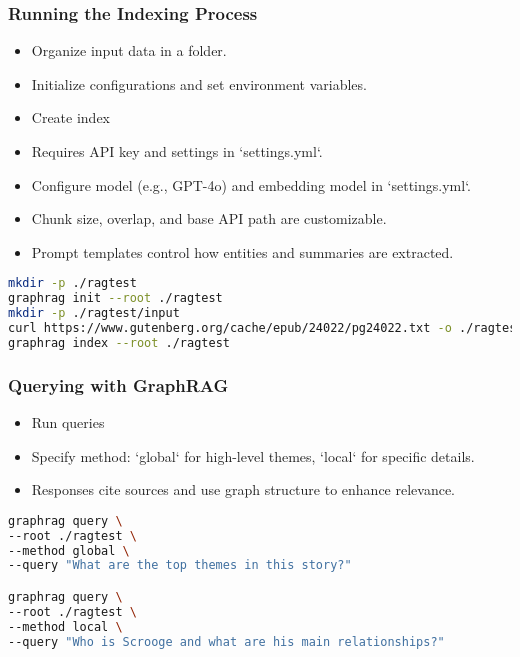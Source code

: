 \begin{frame}[fragile]\frametitle{Running the Indexing Process}
  \begin{itemize}
    \item Organize input data in a folder.
    \item Initialize configurations and set environment variables.
    \item Create index
    \item Requires API key and settings in `settings.yml`.
    \item Configure model (e.g., GPT-4o) and embedding model in `settings.yml`.
    \item Chunk size, overlap, and base API path are customizable.
    \item Prompt templates control how entities and summaries are extracted.	
  \end{itemize}

    \begin{lstlisting}[language=bash]
mkdir -p ./ragtest
graphrag init --root ./ragtest
mkdir -p ./ragtest/input
curl https://www.gutenberg.org/cache/epub/24022/pg24022.txt -o ./ragtest/input/book.txt
graphrag index --root ./ragtest
    \end{lstlisting}  
\end{frame}

\begin{frame}[fragile]\frametitle{Querying with GraphRAG}
  \begin{itemize}
    \item Run queries
    \item Specify method: `global` for high-level themes, `local` for specific details.
    \item Responses cite sources and use graph structure to enhance relevance.
  \end{itemize}
    \begin{lstlisting}[language=bash]
graphrag query \
--root ./ragtest \
--method global \
--query "What are the top themes in this story?"

graphrag query \
--root ./ragtest \
--method local \
--query "Who is Scrooge and what are his main relationships?"
    \end{lstlisting}  
\end{frame}


